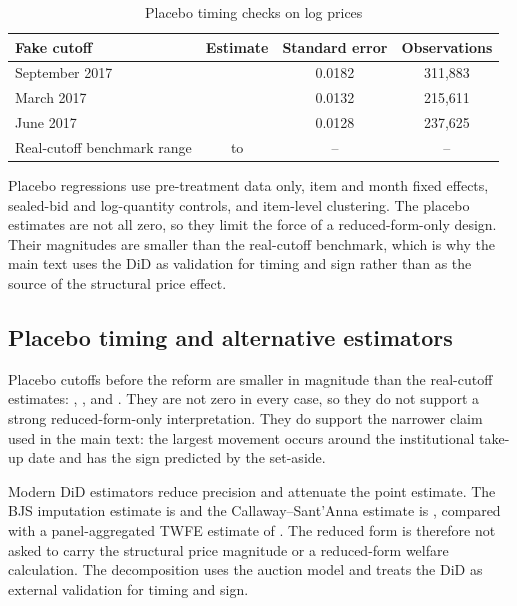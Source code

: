 \documentclass[12pt]{article}
\begin{document}
\begin{table}[!htbp]
\centering
\begin{threeparttable}
\caption{Placebo timing checks on log prices}
\label{tab:app_placebo}
\footnotesize
\setlength{\tabcolsep}{6pt}
\begin{tabular}{lccc}
\toprule
Fake cutoff & Estimate & Standard error & Observations \\
\midrule
September 2017 & \placeboSeventeenSep{} & 0.0182 & 311,883 \\
March 2017 & \placeboSeventeenMar{} & 0.0132 & 215,611 \\
June 2017 & \placeboSeventeenJun{} & 0.0128 & 237,625 \\
Real-cutoff benchmark range & \placeboLowerNp{} to \placeboHigherNp{} & -- & -- \\
\bottomrule
\end{tabular}
\begin{tablenotes}\footnotesize
\item Placebo regressions use pre-treatment data only, item and month fixed
effects, sealed-bid and log-quantity controls, and item-level clustering. The
placebo estimates are not all zero, so they limit the force of a
reduced-form-only design. Their magnitudes are smaller than the real-cutoff
benchmark, which is why the main text uses the DiD as validation for timing and
sign rather than as the source of the structural price effect.
\end{tablenotes}
\end{threeparttable}
\end{table}

\subsection{Placebo timing and alternative estimators}

Placebo cutoffs before the reform are smaller in magnitude than the real-cutoff
estimates: \placeboSeventeenSep, \placeboSeventeenMar, and
\placeboSeventeenJun. They are not zero in every case, so they do not support a
strong reduced-form-only interpretation. They do support the narrower claim
used in the main text: the largest movement occurs around the institutional
take-up date and has the sign predicted by the set-aside.

Modern DiD estimators reduce precision and attenuate the point estimate. The
BJS imputation estimate is \didAltBjsEst{} and the Callaway--Sant'Anna estimate
is \didAltCsEst, compared with a panel-aggregated TWFE estimate of
\didAltTwfeEst. The reduced form is therefore not asked to carry the structural
price magnitude or a reduced-form welfare calculation. The decomposition uses
the auction model and treats the DiD as external validation for timing and
sign.
\end{document}
